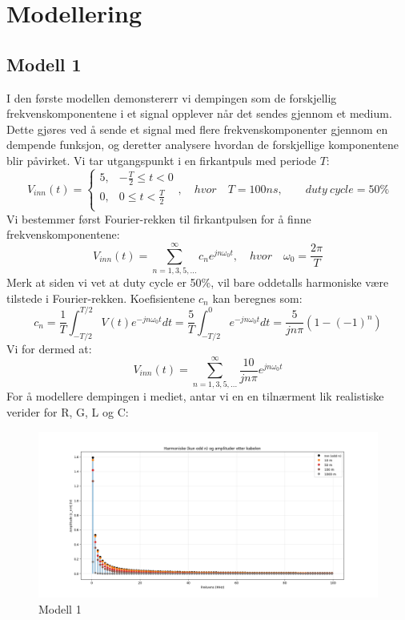 \section{Modellering}
\subsection{Modell 1}
I den første modellen demonstererr vi dempingen som de forskjellig frekvenskomponentene i et signal opplever når det sendes gjennom et medium. Dette gjøres ved å sende et signal med flere frekvenskomponenter gjennom en dempende funksjon, og deretter analysere hvordan de forskjellige komponentene blir påvirket.
Vi tar utgangspunkt i en firkantpuls med periode $T$:
\[
    V_{inn}(t) = \begin{cases}
        5, & -\frac{T}{2} \leq t < 0 \\
        0, & 0 \leq t < \frac{T}{2} \\
    \end{cases}, \quad hvor \quad T = 100ns,\qquad duty\ cycle = 50\%
\]
Vi bestemmer først Fourier-rekken til firkantpulsen for å finne frekvenskomponentene:
\[
    V_{inn}(t) = \sum_{n=1,3,5,...}^{\infty} c_n e^{j n \omega_0 t}, \quad hvor \quad \omega_0 = \frac{2\pi}{T}
\]
Merk at siden vi vet at duty cycle er 50\%, vil bare oddetalls harmoniske være tilstede i Fourier-rekken.
Koefisientene $c_n$ kan beregnes som:
\[
    c_n = \frac{1}{T} \int_{-T/2}^{T/2} V(t) e^{-j n \omega_0 t} dt = \frac{5}{T} \int_{-T/2}^{0} e^{-j n \omega_0 t} dt = \frac{5}{j n \pi} (1 - (-1)^n)
\]
Vi for dermed at:
\[
    V_{inn}(t) = \sum_{n=1,3,5,...}^{\infty} \frac{10}{j n \pi} e^{j n \omega_0 t}
\]
For å modellere dempingen i mediet, antar vi en en tilnærment lik realistiske verider for R, G, L og C:
\begin{figure}[h]
    \centering
    \includegraphics[width=1\textwidth]{Media/modellering1.png}
    \caption{Modell 1}
    \label{fig:modell1}
\end{figure}
